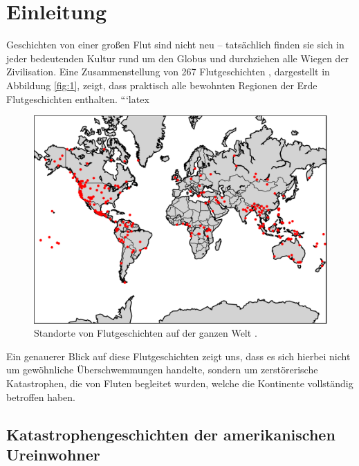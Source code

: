 \documentclass[10pt,twocolumn,letterpaper]{article}
\begin{document}
\section{Einleitung}

Geschichten von einer großen Flut sind nicht neu – tatsächlich finden sie sich in jeder bedeutenden Kultur rund um den Globus und durchziehen alle Wiegen der Zivilisation. Eine Zusammenstellung von 267 Flutgeschichten \cite{3}, dargestellt in Abbildung \ref{fig:1}, zeigt, dass praktisch alle bewohnten Regionen der Erde Flutgeschichten enthalten.
```latex
\begin{figure}[h]
\begin{center}
   \includegraphics[width=1\linewidth]{b.png}
\end{center}
   \caption{Standorte von Flutgeschichten auf der ganzen Welt \cite{3}.}
\label{fig:1}
\label{fig:onecol}
\end{figure}

Ein genauerer Blick auf diese Flutgeschichten zeigt uns, dass es sich hierbei nicht um gewöhnliche Überschwemmungen handelte, sondern um zerstörerische Katastrophen, die von Fluten begleitet wurden, welche die Kontinente vollständig betroffen haben.

\subsection{Katastrophengeschichten der amerikanischen Ureinwohner}
\end{document}
